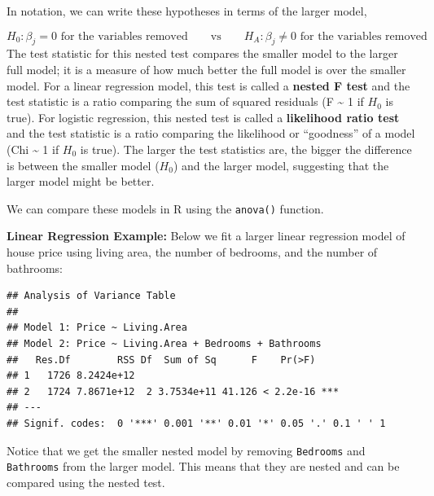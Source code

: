 \documentclass[
]{book}
\newenvironment{Shaded}{\begin{snugshade}}{\end{snugshade}}
\newcommand{\KeywordTok}[1]{\textcolor[rgb]{0.13,0.29,0.53}{\textbf{#1}}}
\newcommand{\NormalTok}[1]{#1}
\newcommand{\OperatorTok}[1]{\textcolor[rgb]{0.81,0.36,0.00}{\textbf{#1}}}
\newcommand{\StringTok}[1]{\textcolor[rgb]{0.31,0.60,0.02}{#1}}
\begin{document}
In notation, we can write these hypotheses in terms of the larger model,

\[H_0: \beta_j = 0 \text{ for the variables removed} \qquad \text{vs} \qquad H_A: \beta_j \neq 0  \text{ for the variables removed}\]
The test statistic for this nested test compares the smaller model to the larger full model; it is a measure of how much better the full model is over the smaller model. For a linear regression model, this test is called a \textbf{nested F test} and the test statistic is a ratio comparing the sum of squared residuals (F \textasciitilde{} 1 if \(H_0\) is true). For logistic regression, this nested test is called a \textbf{likelihood ratio test} and the test statistic is a ratio comparing the likelihood or ``goodness'' of a model (Chi \textasciitilde{} 1 if \(H_0\) is true). The larger the test statistics are, the bigger the difference is between the smaller model (\(H_0\)) and the larger model, suggesting that the larger model might be better.

We can compare these models in R using the \texttt{anova()} function.

\textbf{Linear Regression Example:} Below we fit a larger linear regression model of house price using living area, the number of bedrooms, and the number of bathrooms:

\begin{Shaded}
\end{Shaded}

\begin{verbatim}
## Analysis of Variance Table
## 
## Model 1: Price ~ Living.Area
## Model 2: Price ~ Living.Area + Bedrooms + Bathrooms
##   Res.Df        RSS Df  Sum of Sq      F    Pr(>F)    
## 1   1726 8.2424e+12                                   
## 2   1724 7.8671e+12  2 3.7534e+11 41.126 < 2.2e-16 ***
## ---
## Signif. codes:  0 '***' 0.001 '**' 0.01 '*' 0.05 '.' 0.1 ' ' 1
\end{verbatim}

Notice that we get the smaller nested model by removing \texttt{Bedrooms} and \texttt{Bathrooms} from the larger model. This means that they are nested and can be compared using the nested test.
\end{document}
